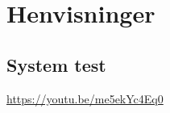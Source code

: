 \section{Henvisninger} \label{Chap:Henvisninger}
\subsection{System test}\label{subsection:System test}
\url{https://youtu.be/me5ekYc4Eq0}